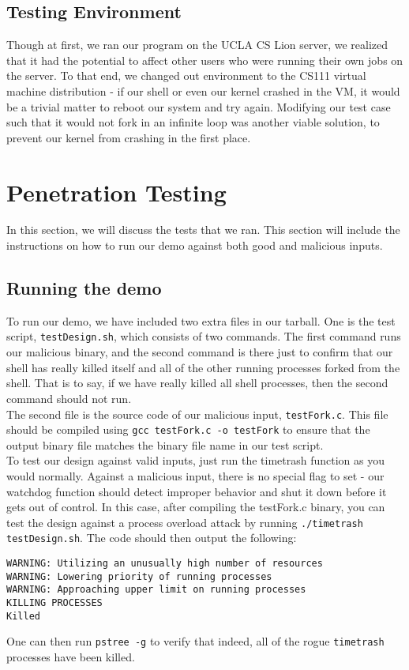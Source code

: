 \documentclass{article}
\begin{document}
\subsection{Testing Environment}
Though at first, we ran our program on the UCLA CS Lion server, we realized
that it had the potential to affect other users who were running their own jobs
on the server. To that end, we changed out environment to the CS111 virtual 
machine distribution - if our shell or even our kernel crashed in the VM, it 
would be a trivial matter to reboot our system and try again. Modifying our 
test case such that it would not fork in an infinite loop was another viable
solution, to prevent our kernel from crashing in the first place. \\


\section{Penetration Testing}

In this section, we will discuss the tests that we ran. This section will
include the instructions on how to run our demo against both good and 
malicious inputs.

\subsection{Running the demo}
To run our demo, we have included two extra files in our tarball. One is the
test script, \verb+testDesign.sh+, which consists of two commands. The first
command runs our malicious binary, and the second command is there just to
confirm that our shell has really killed itself and all of the other running
processes forked from the shell. That is to say, if we have really killed all
shell processes, then the second command should not run. \\
The second file is the source code of our malicious input, \verb+testFork.c+.
This file should be compiled using \verb+gcc testFork.c -o testFork+ to ensure
that the output binary file matches the binary file name in our test script. \\
To test our design against valid inputs, just run the timetrash function as you
would normally. Against a malicious input, there is no special flag to set - 
our watchdog function should detect improper behavior and shut it down before
it gets out of control. In this case, after compiling the testFork.c binary, 
you can test the design against a process overload attack by running
\verb+./timetrash testDesign.sh+. The code should then output the following:
\begin{lstlisting}
WARNING: Utilizing an unusually high number of resources
WARNING: Lowering priority of running processes
WARNING: Approaching upper limit on running processes
KILLING PROCESSES
Killed
\end{lstlisting}
One can then run \verb+pstree -g+ to verify that indeed, all of the rogue
\verb+timetrash+ processes have been killed.
\end{document}

